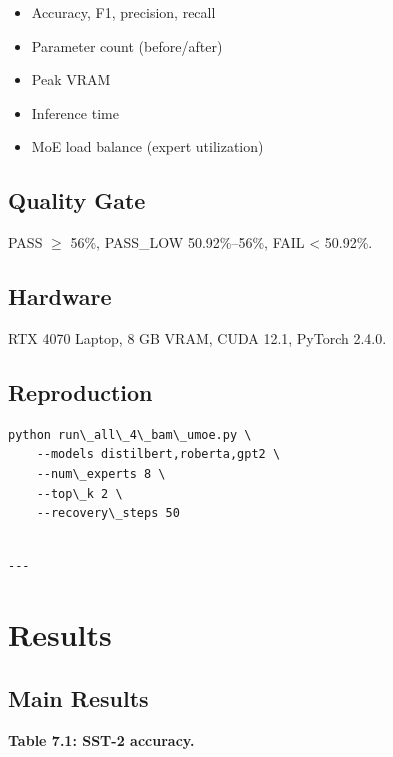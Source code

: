 \begin{itemize}
\item Accuracy, F1, precision, recall
\item Parameter count (before/after)
\item Peak VRAM
\item Inference time
\item MoE load balance (expert utilization)

\end{itemize}
\subsection{Quality Gate}

PASS $\ge$ 56\%, PASS\_LOW 50.92\%--56\%, FAIL \textless{} 50.92\%.

\subsection{Hardware}

RTX 4070 Laptop, 8 GB VRAM, CUDA 12.1, PyTorch 2.4.0.

\subsection{Reproduction}

\begin{lstlisting}
python run\_all\_4\_bam\_umoe.py \
    --models distilbert,roberta,gpt2 \
    --num\_experts 8 \
    --top\_k 2 \
    --recovery\_steps 50
\end{lstlisting}
\begin{lstlisting}

---
\end{lstlisting}

\section{Results}

\subsection{Main Results}

\textbf{Table 7.1: SST-2 accuracy.}

